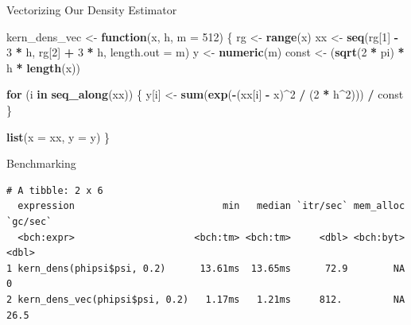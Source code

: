 \documentclass[
  ignorenonframetext,
  aspectratio=1610,
  onlytextwidth]{beamer}
\newenvironment{Shaded}{\begin{snugshade}}{\end{snugshade}}
\newcommand{\AttributeTok}[1]{\textcolor[rgb]{0.13,0.29,0.53}{#1}}
\newcommand{\ControlFlowTok}[1]{\textcolor[rgb]{0.13,0.29,0.53}{\textbf{#1}}}
\newcommand{\DecValTok}[1]{\textcolor[rgb]{0.00,0.00,0.81}{#1}}
\newcommand{\FloatTok}[1]{\textcolor[rgb]{0.00,0.00,0.81}{#1}}
\newcommand{\FunctionTok}[1]{\textcolor[rgb]{0.13,0.29,0.53}{\textbf{#1}}}
\newcommand{\NormalTok}[1]{#1}
\newcommand{\OtherTok}[1]{\textcolor[rgb]{0.56,0.35,0.01}{#1}}
\newcommand{\SpecialCharTok}[1]{\textcolor[rgb]{0.81,0.36,0.00}{\textbf{#1}}}
\begin{document}
\begin{frame}[fragile]{Vectorizing Our Density Estimator}
\label{vectorizing-our-density-estimator}
\begin{Shaded}
\begin{Highlighting}[]
\NormalTok{kern\_dens\_vec }\OtherTok{\textless{}{-}} \ControlFlowTok{function}\NormalTok{(x, h, }\AttributeTok{m =} \DecValTok{512}\NormalTok{) \{}
\NormalTok{  rg }\OtherTok{\textless{}{-}} \FunctionTok{range}\NormalTok{(x)}
\NormalTok{  xx }\OtherTok{\textless{}{-}} \FunctionTok{seq}\NormalTok{(rg[}\DecValTok{1}\NormalTok{] }\SpecialCharTok{{-}} \DecValTok{3} \SpecialCharTok{*}\NormalTok{ h, rg[}\DecValTok{2}\NormalTok{] }\SpecialCharTok{+} \DecValTok{3} \SpecialCharTok{*}\NormalTok{ h, }\AttributeTok{length.out =}\NormalTok{ m)}
\NormalTok{  y }\OtherTok{\textless{}{-}} \FunctionTok{numeric}\NormalTok{(m)}
\NormalTok{  const }\OtherTok{\textless{}{-}}\NormalTok{ (}\FunctionTok{sqrt}\NormalTok{(}\DecValTok{2} \SpecialCharTok{*}\NormalTok{ pi) }\SpecialCharTok{*}\NormalTok{ h }\SpecialCharTok{*} \FunctionTok{length}\NormalTok{(x))}

  \ControlFlowTok{for}\NormalTok{ (i }\ControlFlowTok{in} \FunctionTok{seq\_along}\NormalTok{(xx)) \{}
\NormalTok{    y[i] }\OtherTok{\textless{}{-}} \FunctionTok{sum}\NormalTok{(}\FunctionTok{exp}\NormalTok{(}\SpecialCharTok{{-}}\NormalTok{(xx[i] }\SpecialCharTok{{-}}\NormalTok{ x)}\SpecialCharTok{\^{}}\DecValTok{2} \SpecialCharTok{/}\NormalTok{ (}\DecValTok{2} \SpecialCharTok{*}\NormalTok{ h}\SpecialCharTok{\^{}}\DecValTok{2}\NormalTok{))) }\SpecialCharTok{/}\NormalTok{ const}
\NormalTok{  \}}

  \FunctionTok{list}\NormalTok{(}\AttributeTok{x =}\NormalTok{ xx, }\AttributeTok{y =}\NormalTok{ y)}
\NormalTok{\}}
\end{Highlighting}
\end{Shaded}
\end{frame}

\begin{frame}[fragile]{Benchmarking}
\label{benchmarking-1}
\begin{Shaded}
\end{Shaded}

\begin{verbatim}
# A tibble: 2 x 6
  expression                          min   median `itr/sec` mem_alloc `gc/sec`
  <bch:expr>                     <bch:tm> <bch:tm>     <dbl> <bch:byt>    <dbl>
1 kern_dens(phipsi$psi, 0.2)      13.61ms  13.65ms      72.9        NA      0  
2 kern_dens_vec(phipsi$psi, 0.2)   1.17ms   1.21ms     812.         NA     26.5
\end{verbatim}
\end{frame}
\end{document}
